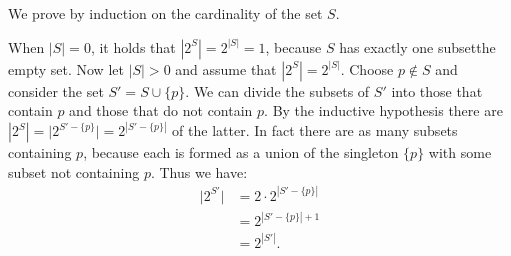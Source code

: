 \exercise
We prove by induction on the cardinality of the set $S$.

When $|S|=0$, it holds that $|2^S|=2^{|S|}=1$, because $S$ has exactly one subset\dash the empty set.
Now let $|S|>0$ and assume that $|2^S|=2^{|S|}$.
Choose $p\notin S$ and consider the set $S'=S\cup\{p\}$.
We can divide the subsets of $S'$ into those that contain $p$ and those that do not contain $p$.
By the inductive hypothesis there are $|2^S|=\bigl|2^{S'-\{p\}}\bigr|=2^{|S'-\{p\}|}$ of the latter.
In fact there are as many subsets containing $p$, because each is formed as a union of the singleton $\{p\}$ with some subset not containing $p$.
Thus we have:
\begin{align*}
    \bigl|2^{S'}\bigr| &= 2\cdot2^{|S'-\{p\}|} \\
    &= 2^{|S'-\{p\}|+1} \\
    &= 2^{|S'|}.
\end{align*}
